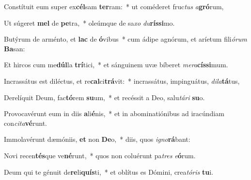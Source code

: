 \item Constítuit eum super ex\textbf{cél}sam \textbf{ter}ram:~* ut coméderet fruc\textit{tus} \textit{a}\textbf{gró}rum,
\item Ut súgeret \textbf{mel} de \textbf{pe}tra,~* oleúmque de sa\textit{xo} \textit{du}\textbf{rís}\textbf{si}mo.
\item Butýrum de arménto, et \textbf{lac} de \textbf{ó}vibus~* cum ádipe agnórum, et aríetum fili\textit{ó}\textit{rum} \textbf{Ba}san:
\item Et hircos cum me\textbf{dúl}la \textbf{trí}tici,~* et sánguinem uvæ bíberet \textit{me}\textit{ra}\textbf{cís}\textbf{si}mum.
\item Incrassátus est diléctus, et re\textbf{cal}ci\textbf{trá}vit:~* incrassátus, impinguátus, \textit{di}\textit{la}\textbf{tá}tus,
\item Derelíquit Deum, fac\textbf{tó}rem \textbf{su}um,~* et recéssit a Deo, salu\textit{tá}\textit{ri} \textbf{su}o.
\item Provocavérunt eum in diis \textbf{a}li\textbf{é}nis,~* et in abominatiónibus ad iracúndiam con\textit{ci}\textit{ta}\textbf{vé}runt.
\item Immolavérunt dæmóniis, \textbf{et} non \textbf{De}o,~* diis, quos \textit{i}\textit{gno}\textbf{rá}bant:
\item Novi recen\textbf{tés}que ve\textbf{né}runt,~* quos non coluérunt pa\textit{tres} \textit{e}\textbf{ó}rum.
\item Deum qui te génuit de\textbf{re}li\textbf{quís}ti,~* et oblítus es Dómini, crea\textit{tó}\textit{ris} \textbf{tu}i.
